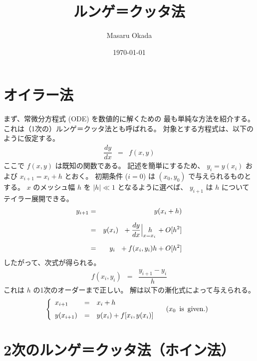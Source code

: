 \documentclass[uplatex,a4j,12pt,dvipdfmx]{jsarticle}
\title{ルンゲ＝クッタ法}
\author{Masaru Okada}
\date{\today}
\begin{document}
\maketitle

\section{オイラー法}

まず、常微分方程式 (ODE) を数値的に解くための
最も単純な方法を紹介する。
これは（1次の）ルンゲ＝クッタ法とも呼ばれる。
対象とする方程式は、以下のように仮定する。
\begin{eqnarray}
	\dfrac{dy}{dx} &=& f(x,y)
\end{eqnarray}
ここで $f(x,y)$ は既知の関数である。
記述を簡単にするため、
$y_{i}=y(x_{i})$
および
$x_{i+1} = x_{i} + h$
とおく。
初期条件 ($i=0$) は $(x_{0},y_{0})$ で与えられるものとする。
$x$ のメッシュ幅 $h$ を $| h | \ll 1$ となるように選べば、
$y_{i+1}$ は $h$ についてテイラー展開できる。
\begin{eqnarray}
	y_{i+1} &=&
	y(x_{i} + h)
	\nonumber \\[2mm] &=&
	y(x_{i}) \ \
	+
	\dfrac{dy}{dx} \Big|_{x=x_{i}} \hspace{-4mm} h \ \
	+
	O[h^{2}]
	\nonumber \\[2mm] &=&
	y_{i} \ \
	+
	f(x_{i},y_{i}) h
	+
	O[h^{2}]
\end{eqnarray}
したがって、次式が得られる。
\begin{eqnarray}
	f(x_{i},y_{i}) &=& \dfrac{y_{i+1} - y_{i}}{h}
\end{eqnarray}
これは $h$ の1次のオーダーまで正しい。
解は以下の漸化式によって与えられる。
\begin{eqnarray}
	\left\{
	\begin{array}{lcl}
		x_{i+1}    & = & x_{i} + h                                             \\[-1mm]
		           &   & \hspace{35mm} ( x_{0} {\rm \ \ \! is \ \ \! given.} ) \\[-1mm]
		y(x_{i+1}) & = & y(x_{i}) + f[x_{i},y(x_{i})]
	\end{array}
	\right.
\end{eqnarray}

\section{2次のルンゲ＝クッタ法（ホイン法）}
\end{document}
